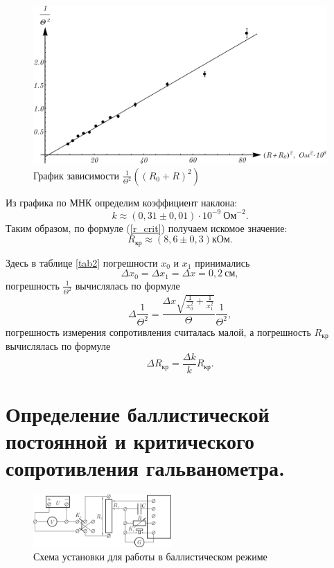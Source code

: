 \documentclass[12pt,a4paper]{article}
\begin{document}
\begin{figure}[h]\centering
\includegraphics[width = 1\textwidth]{Plot2}
\captionsetup{justification = centering}
\caption{График зависимости $\frac{1}{\Theta^2}\left(\left(R_0+R\right)^2\right)$ \label{Fig4}}
\end{figure}

Из графика по МНК определим коэффициент наклона:
\begin{equation}
k \approx (0,31\pm0,01)\cdot 10^{-9}~\text{Ом}^{-2}.\label{k_val}
\end{equation}
Таким образом, по формуле (\ref{r_crit}) получаем искомое значение:
\begin{equation}
R_\text{кр} \approx (8,6 \pm 0,3)\text{кОм}.
\end{equation}

Здесь в таблице \ref{tab2} погрешности $x_0$ и $x_1$ принимались
\begin{equation}
\Delta x_0 = \Delta x_1 = \Delta x = 0,2~\text{см},
\end{equation}
погрешность $\frac{1}{\Theta^2}$ вычислялась по формуле
\begin{equation}
\Delta \frac{1}{\Theta^2} = \frac{\Delta x\sqrt{\frac{1}{x_0^2} + \frac{1}{x_1^2}}}{\Theta}\frac{1}{\Theta^2},
\end{equation}
погрешность измерения сопротивления считалась малой, а погрешность $R_\text{кр}$ вычислялась по формуле
\begin{equation}
\Delta R_\text{кр} = \frac{\Delta k}{k}R_\text{кр}.
\end{equation}
\section{Определение баллистической постоянной и критического сопротивления гальванометра.}
\begin{figure}
\centering\includegraphics[width = 0.47\textwidth]{Sch2}
\captionsetup{justification = centering}
\caption{Схема установки для работы в баллистическом режиме} \label{Fig5}
\end{figure}
\end{document}
